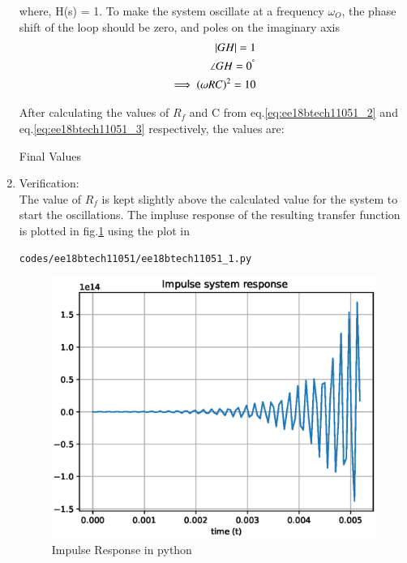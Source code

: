 \begin{enumerate}[label=\arabic*.,ref=\theenumi]
where, H(s) = 1. To make the system oscillate at a frequency $\omega_{O}$, the phase shift of the loop should be zero, and poles on the imaginary axis
\begin{align}
    |GH|=1\\ \angle GH = 0^{\degree} \\
    \implies (\omega RC)^{2} = 10 \label{eq:ee18btech11051_3}
\end{align}

After calculating the values of $R_{f}$ and C from eq.\ref{eq:ee18btech11051_2} and eq.\ref{eq:ee18btech11051_3} respectively, the values are:
\begin{table}[!ht]
    \centering
    
    \caption{Final Values}
    \label{table:ee18btech11051_table1}
\end{table}

\item
Verification:\\
The value of $R_{f}$ is kept slightly above the calculated value for the system to start the oscillations. The impluse response of the resulting transfer function is plotted in fig.\ref{fig:ee18btech11051_plot1} using the plot in 
\begin{lstlisting}
codes/ee18btech11051/ee18btech11051_1.py
\end{lstlisting}

\begin{figure}[!ht]
\centering
\includegraphics[width=\columnwidth]{./figs/ee18btech11051/ee18btech11051_plot1.eps}
\caption{Impulse Response in python}
\label{fig:ee18btech11051_plot1}
\end{figure}


\end{enumerate}

